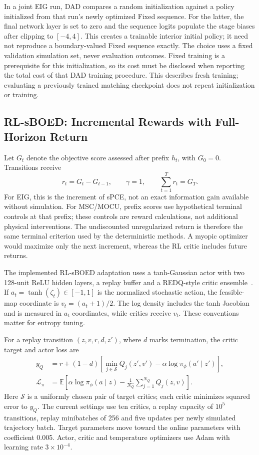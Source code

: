 \documentclass[journal]{IEEEtran}
\newcommand{\E}{\mathbb{E}}
\begin{document}
In a joint EIG run, DAD compares a random initialization against a policy
initialized from that run's newly optimized Fixed sequence. For the latter,
the final network layer is set to zero and the sequence logits populate the
stage biases after clipping to $[-4,4]$. This creates a trainable interior
initial policy; it need not reproduce a boundary-valued Fixed sequence exactly.
The choice uses a fixed validation simulation set, never evaluation outcomes.
Fixed training is a prerequisite for this initialization, so its cost must
be disclosed when reporting the total cost of that DAD training procedure.
This describes fresh training; evaluating a previously trained matching
checkpoint does not repeat initialization or training.

\subsection{RL-sBOED: Incremental Rewards with Full-Horizon Return}
Let $G_t$ denote the objective score assessed after prefix $h_t$, with $G_0=0$.
Transitions receive
\begin{equation}
r_t=G_t-G_{t-1},\qquad \gamma=1,
\qquad \sum_{t=1}^{T}r_t=G_T.
\label{eq:rl-rewards}
\end{equation}
For EIG, this is the increment of sPCE, not an exact information gain available
without simulation. For MSC/MOCU, prefix scores use hypothetical terminal
controls at that prefix; these controls are reward calculations, not additional
physical interventions. The undiscounted unregularized return is therefore
the same terminal criterion used by the deterministic methods. A myopic
optimizer would maximize only the next increment, whereas the RL critic
includes future returns.

The implemented RL-sBOED adaptation uses a tanh-Gaussian actor with two
128-unit ReLU hidden layers, a replay buffer and a REDQ-style critic
ensemble~\cite{blau2022rlsboed}. If $a_t=\tanh(\zeta_t)\in[-1,1]$ is the
normalized stochastic action, the feasible-map coordinate is $v_t=(a_t+1)/2$.
The log density includes the tanh Jacobian and is measured in $a_t$ coordinates,
while critics receive $v_t$. These conventions matter for entropy tuning.

For a replay transition $(z,v,r,d,z')$, where $d$ marks termination, the
critic target and actor loss are
\begin{align}
y_Q&=r+(1-d)\left[
 \min_{j\in\mathcal S}\overline Q_j(z',v')-\alpha\log\pi_\phi(a'\mid z')\right],\\
\mathcal L_\pi&=\E\left[\alpha\log\pi_\phi(a\mid z)
 -\frac{1}{N_Q}\sum_{j=1}^{N_Q}Q_j(z,v)\right].
\label{eq:redq-objectives}
\end{align}
Here $\mathcal S$ is a uniformly chosen pair of target critics; each critic
minimizes squared error to $y_Q$. The current settings use ten critics,
a replay capacity of $10^5$ transitions, replay minibatches of 256 and five
updates per newly simulated trajectory batch. Target parameters move toward
the online parameters with coefficient 0.005. Actor, critic and temperature
optimizers use Adam with learning rate $3\times10^{-4}$.
\end{document}
